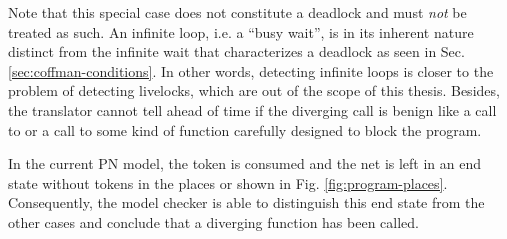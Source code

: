 Note that this special case does not constitute a deadlock and must \emph{not} be treated as such.
An infinite loop, i.e. a ``busy wait'', is in its inherent nature distinct from the infinite wait that
characterizes a deadlock as seen in Sec. \ref{sec:coffman-conditions}.
In other words, detecting infinite loops is closer to the problem of detecting livelocks,
which are out of the scope of this thesis.
Besides, the translator cannot tell ahead of time
if the diverging call is benign like a call to 
or a call to some kind of function carefully designed to block the program.

In the current \acrshort{PN} model, the token is consumed and the net is left
in an end state without tokens in the places
 or  shown in Fig. \ref{fig:program-places}.
Consequently, the model checker is able to distinguish this end state from the other cases
and conclude that a diverging function has been called.